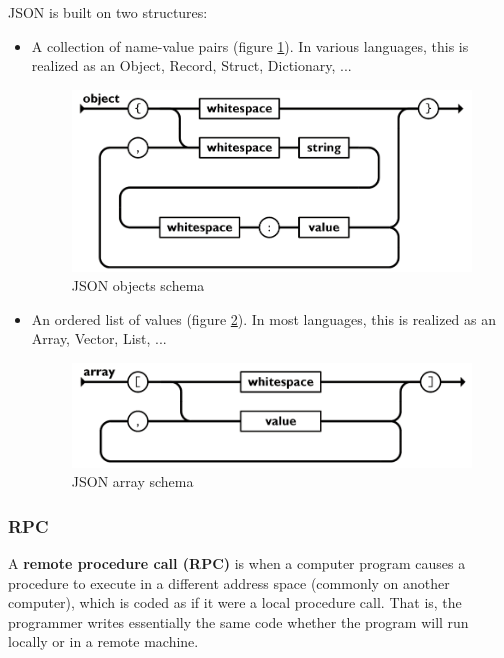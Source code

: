 \documentclass[a4paper, 12pt]{article} %
\begin{document}
            JSON is built on two structures\cite{jsonSchema}:
            \begin{itemize}
                \item A collection of name-value pairs (figure \ref{fig:json_objects}). In various languages, this is realized as an Object, Record, Struct, Dictionary, ...
                \begin{figure}[h]
                    \centering
                    \includegraphics[width=1.0\textwidth]{json-objects.png}
                    \caption{JSON objects schema}
                    \label{fig:json_objects}
                \end{figure}
                \item An ordered list of values (figure \ref{fig:json_arrays}). In most languages, this is realized as an Array, Vector, List, ...
                \begin{figure}[h]
                    \centering
                    \includegraphics[width=1.0\textwidth]{json-arrays.png}
                    \caption{JSON array schema}
                    \label{fig:json_arrays}
                \end{figure}
            \end{itemize}

        \subsubsection{RPC}
            A \textbf{remote procedure call (RPC)}\cite{rpc} is when a computer program causes a procedure to execute in a different address space (commonly on another computer), which is coded as if it were a local procedure call. That is, the programmer writes essentially the same code whether the program will run locally or in a remote machine.\\
            
\end{document}
